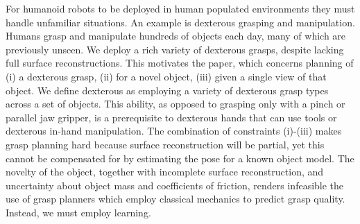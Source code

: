 \noindent
For humanoid robots to be deployed in human populated environments they must handle unfamiliar situations. An example is dexterous grasping and manipulation. Humans grasp and manipulate hundreds of objects each day, many of which are previously unseen. We deploy a rich variety of dexterous grasps, despite lacking full surface reconstructions. This motivates the paper, which concerns planning of (i) a dexterous grasp, (ii) for a novel object, (iii) given a single view of that object. We define dexterous as employing a variety of dexterous grasp types across a set of objects. This ability, as opposed to grasping only with a pinch or parallel jaw gripper, is a prerequisite to dexterous hands that can use tools or dexterous in-hand manipulation. The combination of constraints (i)-(iii) makes grasp planning hard because surface reconstruction will be partial, yet this cannot be compensated for by estimating the pose for a known object model. The novelty of the object, together with incomplete surface reconstruction, and uncertainty about object mass and coefficients of friction, renders infeasible the use of grasp planners which employ classical mechanics to predict grasp quality. Instead, we must employ learning.

